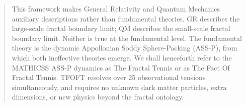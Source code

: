 \documentclass[11pt,a4paper]{article}
\begin{document}
\begin{abstract}
This framework makes General Relativity and Quantum Mechanics auxiliary descriptions rather than fundamental theories. GR describes the large-scale fractal boundary limit; QM describes the small-scale fractal boundary limit. Neither is true at the fundamental level. The fundamental theory is the dynamic Appollonian Soddy Sphere-Packing (ASS-P), from which both ineffective theories emerge. We shall henceforth refer to the MATHICSS ASS-P dynamics as The Fractal Tennis or as The Fact Of Fractal Tennis. TFOFT resolves over 25 observational tensions simultaneously, and requires no unknown dark matter particles, extra dimensions, or new physics beyond the fractal ontology.

\end{abstract}

\end{document}

